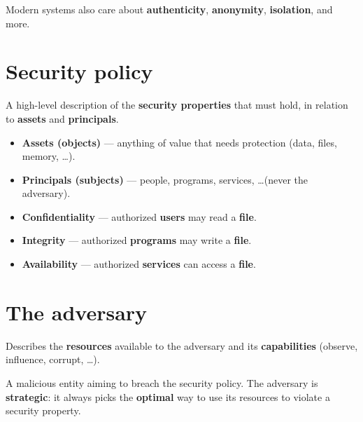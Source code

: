 \begin{rembox}[title=Beyond the CIA triad]
Modern systems also care about \textbf{authenticity}, \textbf{anonymity},
\textbf{isolation}, and more.
\end{rembox}

\section{Security policy}

\begin{defnbox}[title=Security policy]
A high-level description of the \textbf{security properties} that must hold, in
relation to \textbf{assets} and \textbf{principals}.
\begin{itemize}
  \item \textbf{Assets (objects)} — anything of value that needs protection (data, files, memory, \ldots).
  \item \textbf{Principals (subjects)} — people, programs, services, \ldots (never the adversary).
\end{itemize}
\end{defnbox}

\begin{propbox}[title=Properties in terms of principals and assets]
\begin{itemize}
  \item \textbf{Confidentiality} — authorized \textbf{users} may read a \textbf{file}.
  \item \textbf{Integrity} — authorized \textbf{programs} may write a \textbf{file}.
  \item \textbf{Availability} — authorized \textbf{services} can access a \textbf{file}.
\end{itemize}
\end{propbox}

\section{The adversary}

\begin{defnbox}[title=Threat model]
Describes the \textbf{resources} available to the adversary and its \textbf{capabilities}
(observe, influence, corrupt, \ldots).
\end{defnbox}

\begin{defnbox}[title=Adversary]
A malicious entity aiming to breach the security policy. The adversary is
\textbf{strategic}: it always picks the \textbf{optimal} way to use its resources to
violate a security property.
\end{defnbox}

